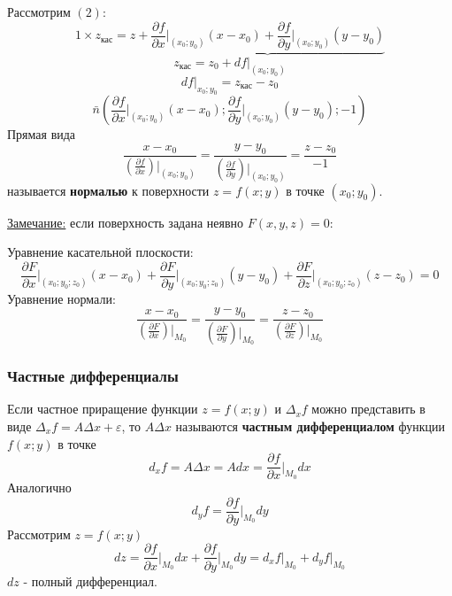 \documentclass[12pt]{article}
\begin{document}
    Рассмотрим $(2)$:
    \[ 1 \times z_{\text{кас}} = z + \underbrace{\frac{\partial f}{\partial x} \Big|_{(x_0; y_0)} (x-x_0) + \frac{\partial f}{\partial y} \Big|_{(x_0; y_0)} (y-y_0)} \]
    \[ z_{\text{кас}} = z_0 + df \Big|_{(x_0; y_0)} \]
    \[ df \Big|_{x_0; y_0} = z_{\text{кас}} - z_0 \]
    \[ \bar{n} \left(\frac{\partial f}{\partial x} \Big|_{(x_0; y_0)} (x-x_0); \frac{\partial f}{\partial y} \Big|_{(x_0; y_0)} (y-y_0); -1\right) \]
    Прямая вида
    \[ \frac{x - x_0}{\left( \frac{\partial f}{\partial x} \right) \Big|_{(x_0; y_0)}} = \frac{y - y_0}{\left( \frac{\partial f}{\partial y} \right) \Big|_{(x_0; y_0)}} = \frac{z - z_0}{-1} \]
    называется \textbf{нормалью} к поверхности $z = f(x; y)$ в точке $(x_0; y_0)$.\par\noindent
    \underline{Замечание:} если поверхность задана неявно $F(x,y,z) = 0$:
    \begin{adjustwidth}{1.5em}{1.5em}
        Уравнение касательной плоскости: 
        \[ \frac{\partial F}{\partial x} \Big|_{(x_0; y_0; z_0)} (x-x_0) + \frac{\partial F}{\partial y} \Big|_{(x_0; y_0; z_0)} (y-y_0) + \frac{\partial F}{\partial z} \Big|_{(x_0; y_0; z_0)} (z-z_0) = 0 \]
        Уравнение нормали:
        \[ \frac{x - x_0}{\left( \frac{\partial F}{\partial x} \right) \Big|_{M_0}} = \frac{y - y_0}{\left( \frac{\partial F}{\partial y} \right) \Big|_{M_0}} = \frac{z - z_0}{\left( \frac{\partial F}{\partial z} \right) \Big|_{M_0}} \]
    \end{adjustwidth}
    \subsubsection*{Частные дифференциалы}
    Если частное приращение функции $z = f(x;y)$ и $\Delta_x f$ можно представить в виде $\Delta_x f = A \Delta x + \varepsilon$, то $A \Delta x$ называются \textbf{частным дифференциалом} функции $f(x;y)$ в точке 
    \[ d_x f = A\Delta x = Adx = \frac{\partial f}{\partial x} \Big|_{M_0}dx \]
    Аналогично
    \[ d_y f = \frac{\partial f}{\partial y} \Big|_{M_0}dy \]
    Рассмотрим $z = f(x;y)$
    \[ dz = \frac{\partial f}{\partial x} \Big|_{M_0}dx + \frac{\partial f}{\partial y} \Big|_{M_0}dy = d_x f \Big|_{M_0} + d_y f \Big|_{M_0} \]
    $dz$ - полный дифференциал.
\end{document}
